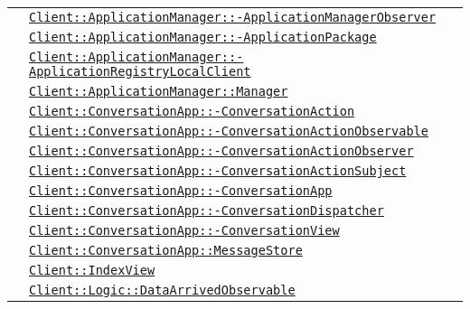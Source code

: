 \begin{longtable}{|>{\centering}m{3cm}|m{10cm}<{\centering}|}
& \hyperref[Client::ApplicationManager::ApplicationManagerObserver]{\texttt{Client::ApplicationManager::-\linebreak ApplicationManagerObserver}}\\
& \hyperref[Client::ApplicationManager::ApplicationPackage]{\texttt{Client::ApplicationManager::-\linebreak ApplicationPackage}}\\
& \hyperref[Client::ApplicationManager::ApplicationRegistryLocalClient]{\texttt{Client::ApplicationManager::-\linebreak ApplicationRegistryLocalClient}}\\
& \hyperref[Client::ApplicationManager::Manager]{\texttt{Client::ApplicationManager::Manager}}\\
& \hyperref[Client::ConversationApp::ConversationAction]{\texttt{Client::ConversationApp::-\linebreak ConversationAction}}\\
& \hyperref[Client::ConversationApp::ConversationActionObservable]{\texttt{Client::ConversationApp::-\linebreak ConversationActionObservable}}\\
& \hyperref[Client::ConversationApp::ConversationActionObserver]{\texttt{Client::ConversationApp::-\linebreak ConversationActionObserver}}\\
& \hyperref[Client::ConversationApp::ConversationActionSubject]{\texttt{Client::ConversationApp::-\linebreak ConversationActionSubject}}\\
& \hyperref[Client::ConversationApp::ConversationApp]{\texttt{Client::ConversationApp::-\linebreak ConversationApp}}\\
& \hyperref[Client::ConversationApp::ConversationDispatcher]{\texttt{Client::ConversationApp::-\linebreak ConversationDispatcher}}\\
& \hyperref[Client::ConversationApp::ConversationView]{\texttt{Client::ConversationApp::-\linebreak ConversationView}}\\
& \hyperref[Client::ConversationApp::MessageStore]{\texttt{Client::ConversationApp::MessageStore}}\\
& \hyperref[Client::IndexView]{\texttt{Client::IndexView}}\\
& \hyperref[Client::Logic::DataArrivedObservable]{\texttt{Client::Logic::DataArrivedObservable}}\\

\end{longtable}
